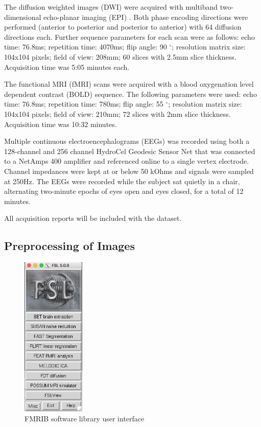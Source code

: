 The diffusion weighted images (DWI) were acquired with multiband two-dimensional echo-planar imaging (EPI) \cite{ref:epi}. Both phase encoding directions were performed (anterior to posterior and posterior to anterior) with 64 diffusion directions each. Further sequence parameters for each scan were as follows: echo time: 76.8ms; repetition time: 4070ms; flip angle: 90 $^{\circ}$; resolution matrix size: 104x104 pixels; field of view: 208mm; 60 slices with 2.5mm slice thickness. Acquisition time was 5:05 minutes each.

The functional MRI (fMRI) scans were acquired with a blood oxygenation level dependent contrast (BOLD) sequence. The following parameters were used: echo time: 76.8ms; repetition time: 780ms; flip angle: 55 $^{\circ}$; resolution matrix size: 104x104 pixels; field of view: 210mm; 72 slices with 2mm slice thickness. Acquisition time was 10:32 minutes.

Multiple continuous electroencephalograms (EEGs) was recorded using both a 128-channel and 256 channel HydroCel Geodesic Sensor Net that was connected to a NetAmps 400 amplifier and referenced online to a single vertex electrode. Channel impedances were kept at or below 50 kOhms and signals were sampled at 250Hz. The EEGs were recorded while the subject sat quietly in a chair, alternating two-minute epochs of eyes open and eyes closed, for a total of 12 minutes.

All acquisition reports will be included with the dataset.

\subsection{Preprocessing of Images}
\label{sec:preprocess}

\begin{figure}
    \centering
    \vspace{-63pt}
    \includegraphics[width=3cm]{Figures/FSL}
    \caption{FMRIB software library user interface}
    \label{fig:fsl}
\end{figure}

